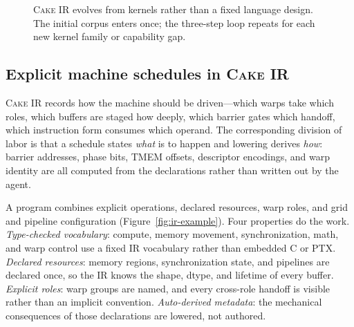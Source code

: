 \documentclass[11pt]{article}
\newcommand{\cakeir}{\textsc{Cake IR}}
\begin{document}
\begin{figure}[!htbp]
  \centering
  
  \caption{\cakeir{} evolves from kernels rather than a fixed language design.
  The initial corpus enters once; the three-step loop repeats for each new
  kernel family or capability gap.}
  \label{fig:ir-evolution}
\end{figure}

\FloatBarrier

\subsection{Explicit machine schedules in \cakeir{}}
\label{sec:cake-ir}

\cakeir{} records how the machine should be driven---which warps take which
roles, which buffers are staged how deeply,
which barrier gates which handoff, which instruction form consumes which
operand. The corresponding division of labor is that a schedule states
\emph{what} is to happen and lowering derives \emph{how}: barrier addresses,
phase bits, TMEM offsets, descriptor encodings, and warp identity are all
computed from the declarations rather than written out by the agent.

A program combines explicit operations, declared resources, warp roles, and
grid and pipeline configuration (Figure~\ref{fig:ir-example}). Four properties
do the work. \emph{Type-checked vocabulary}: compute, memory movement,
synchronization, math, and warp control use a fixed IR vocabulary rather than
embedded C or PTX. \emph{Declared resources}: memory regions, synchronization
state, and pipelines are declared once, so the IR knows the shape, dtype, and
lifetime of every buffer. \emph{Explicit roles}: warp groups are named, and
every cross-role handoff is visible rather than an implicit convention.
\emph{Auto-derived metadata}: the mechanical consequences of those declarations
are lowered, not authored.
\end{document}
